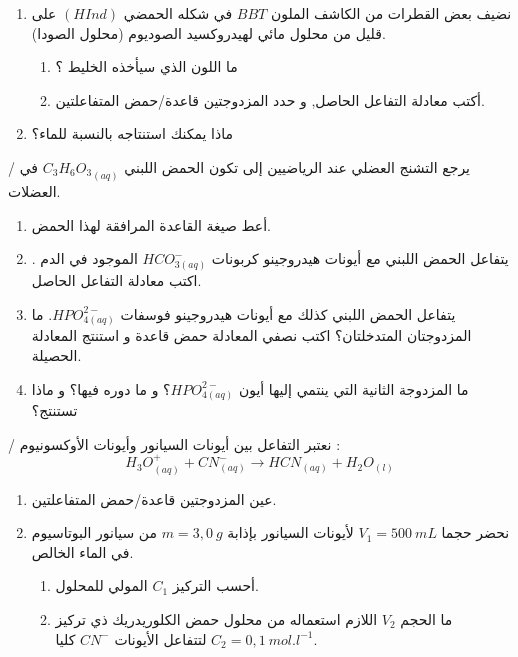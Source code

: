 \documentclass[14pt,a4paper]{extarticle}
\begin{document}
{\begin{exercice}{}
\begin{enumerate}
\begin{enumerate}
\end{enumerate}
\item نضيف بعض القطرات من الكاشف الملون
$BBT$
في شكله الحمضي
$(HInd)$
على قليل من محلول مائي لهيدروكسيد الصوديوم (محلول الصودا).
\begin{enumerate}
\item ما اللون الذي سيأخذه الخليط ؟
\item أكتب معادلة التفاعل الحاصل, و حدد المزدوجتين قاعدة/حمض المتفاعلتين.
\end{enumerate}
\item ماذا يمكنك استنتاجه بالنسبة للماء؟
\end{enumerate}				
					\end{exercice}%
\begin{exercice}{}/
يرجع التشنج العضلي عند الرياضيين إلى تكون الحمض اللبني
${C_3H_6O_3}_{(aq)}$
في العضلات.
\begin{enumerate}
\item أعط صيغة القاعدة المرافقة لهذا الحمض.
\item يتفاعل الحمض اللبني مع أيونات هيدروجينو كربونات
$HCO^-_{3(aq)}$
الموجود في الدم . اكتب معادلة التفاعل الحاصل.
\item يتفاعل الحمض اللبني كذلك مع أيونات هيدروجينو فوسفات
$HPO^{2-}_{4(aq)}$.
ما المزدوجتان المتدخلتان؟
اكتب نصفي المعادلة حمض قاعدة و استنتج المعادلة الحصيلة.
\item ما المزدوجة الثانية التي ينتمي إليها أيون
$HPO^{2-}_{4(aq)}$؟
و ما دوره فيها؟ و ماذا تستنتج؟
\end{enumerate}
					\end{exercice}%
\begin{exercice}{}/
نعتبر التفاعل بين أيونات السيانور وأيونات الأوكسونيوم :
$$H_3O^{+}_{(aq)} +CN^{-}_{(aq)} \rightarrow HCN_{(aq)} + H_2O_{(l)}$$
\begin{enumerate}
\item عين المزدوجتين قاعدة/حمض المتفاعلتين.
\item نحضر حجما
$V_1 = 500\ mL$
 لأيونات السيانور بإذابة
$m=3,0\ g$
من سيانور البوتاسيوم في الماء الخالص.
\begin{enumerate}
\item أحسب التركيز 
$C_1$
المولي للمحلول.
\item ما الحجم
$V_2$
 اللازم استعماله من محلول حمض
الكلوريدريك ذي تركيز
$C_2 = 0,1\ mol.l^{-1}$
 لتتفاعل
الأيونات 
$CN^{-}$
كليا.
\end{enumerate}
\end{enumerate}
\end{exercice}{}
}
\end{document}
